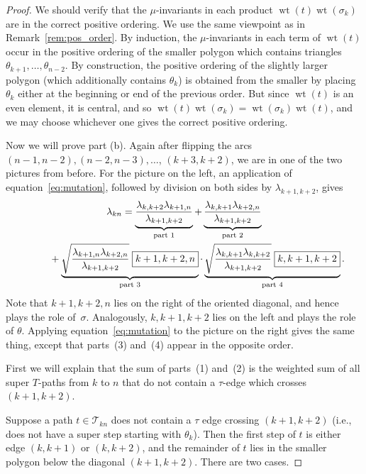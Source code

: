 \documentclass[pdftex]{sigma}
\numberwithin{equation}{section}
\DeclareMathOperator{\wt}{wt}
\renewcommand{\l}[2]{\lambda_{#1#2}}
\begin{document}
\begin{proof}
 We should verify that the $\mu$-invariants in each product $\wt(t)\wt(\sigma_k)$ are in the correct positive ordering. {We use the same viewpoint as in Remark~\ref{rem:pos_order}.} By induction, the $\mu$-invariants
 in each term of $\wt(t)$ occur in the positive ordering of the smaller polygon which contains triangles $\theta_{k+1},\dots,\theta_{n-2}$.
 By construction, the positive ordering of the slightly larger polygon (which additionally contains $\theta_k$) is obtained from the smaller by
 placing $\theta_k$ either at the beginning or end of the previous order. But since $\wt(t)$ is an even element, it is central, and so
 $\wt(t)\wt(\sigma_k) = \wt(\sigma_k)\wt(t)$, and we may choose whichever one gives the correct positive ordering.

 Now we will prove part (b). Again after flipping the arcs $(n-1,n-2), (n-2,n-3), \dots$, $(k+3,k+2)$, we are in one of the
 two pictures from before. For the picture on the left, an application of equation~\eqref{eq:mutation}, followed by division on both sides by $\lambda_{k+1,k+2}$, gives
 \begin{gather*}
 \l kn =
 \underbrace{
 \frac{\lambda_{k,k+2} \lambda_{k+1,n}}{\lambda_{k+1,k+2}}}_{\text{part 1}}
 +
 \underbrace{\frac{\lambda_{k,k+1} \lambda_{k+2,n}}{\lambda_{k+1,k+2}}}_{\text{part 2}}\nonumber \\
 \hphantom{\l kn =}{}+
 \underbrace{\sqrt{\frac{\lambda_{k+1,n} \lambda_{k+2,n}}{\lambda_{k+1,k+2}}}\; \boxed{k+1,k+2,n}}_{\text{part 3}}
 \cdot
 \underbrace{\sqrt{\frac{\lambda_{k,k+1} \lambda_{k,k+2}}{\lambda_{k+1,k+2}}}\; \boxed{k,k+1,k+2}}_{\text{part 4}}.%
 \end{gather*}
 Note that $\boxed{k+1,k+2,n}$ lies on the right of the oriented diagonal, and hence plays the role of~$\sigma$. Analogously,
 $\boxed{k,k+1,k+2}$ lies on the left and plays the role of $\theta$. Applying equation~\eqref{eq:mutation} to the picture on the right gives the same thing, except that parts~(3) and~(4) appear
 in the opposite order.

 First we will explain that the sum of parts~(1) and~(2) is the weighted sum of all super $T$-paths from $k$ to $n$
 that do not contain a $\tau$-edge which crosses $(k+1,k+2)$.

 Suppose a path $t \in \mathcal{T}_{kn}$ does not contain a $\tau$ edge crossing $(k+1,k+2)$ (i.e., does not have a super step starting with $\theta_k$).
 Then the first step of $t$ is either edge $(k,k+1)$ or $(k,k+2)$, and the remainder of $t$ lies in the smaller polygon below the diagonal $(k+1,k+2)$.
 There are two cases.


\end{proof}
\end{document}
